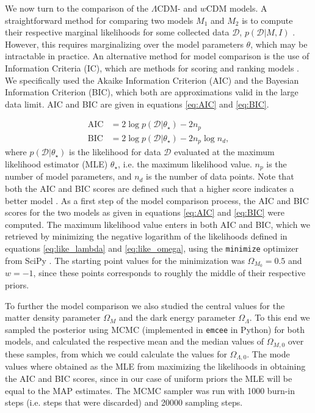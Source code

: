 \documentclass[11pt,a4paper]{article}
\begin{document}
We now turn to the comparison of the $\Lambda$CDM- and $w$CDM models. A straightforward method for comparing two models $M_1$ and $M_2$ is to compute their respective marginal likelihoods for some collected data $\mathcal{D}$, $p\left(\mathcal{D} \vert M, I \right)$ \cite{lec3}. However, this requires marginalizing over the model parameters $\theta$, which may be intractable in practice. An alternative method for model comparison is the use of Information Criteria (IC), which are methods for scoring and ranking models \cite{lec3}. We specifically used the Akaike Information Criterion (AIC) and the Bayesian Information Criterion (BIC), which both are approximations valid in the large data limit. AIC and BIC are given in equations \eqref{eq:AIC} and \eqref{eq:BIC}. 

\begin{align}
    \label{eq:AIC}
    \text{AIC} &= 2 \log{p\left(\mathcal{D} \vert \theta_{\star} \right)} - 2n_p \\
    \label{eq:BIC}
    \text{BIC} &= 2 \log{p\left(\mathcal{D} \vert \theta_{\star} \right)} - 2n_p \log{n_d},
\end{align}
where $p\left(\mathcal{D} \vert \theta_{\star} \right)$ is the likelihood for data $\mathcal{D}$ evaluated at the maximum likelihood estimator (MLE) $\theta_\star$, i.e. the maximum likelihood value. $n_p$ is the number of model parameters, and $n_d$ is the number of data points. Note that both the AIC and BIC scores are defined such that a higher score indicates a better model \cite{lec3}. As a first step of the model comparison process, the AIC and BIC scores for the two models as given in equations \eqref{eq:AIC} and \eqref{eq:BIC} were computed. The maximum likelihood value enters in both AIC and BIC, which we retrieved by minimizing the negative logarithm of the likelihoods defined in equations \eqref{eq:like_lambda} and \eqref{eq:like_omega}, using the \texttt{minimize} optimizer from SciPy \cite{scipy_min}. The starting point values for the minimization was $\Omega_{M_0}=0.5$ and $w=-1$, since these points corresponds to roughly the middle of their respective priors. 

To further the model comparison we also studied the central values for the matter density parameter $\Omega_M$ and the dark energy parameter $\Omega_\Lambda$. To this end we sampled the posterior using MCMC (implemented in \texttt{emcee} in Python) for both models, and calculated the respective mean and the median values of $\Omega_{M,0}$ over these samples, from which we could calculate the values for $\Omega_{\Lambda,0}$. The mode values where obtained as the MLE from maximizing the likelihoods in obtaining the AIC and BIC scores, since in our case of uniform priors the MLE will be equal to the MAP estimates. The MCMC sampler was run with 1000 burn-in steps (i.e. steps that were discarded) and 20000 sampling steps. 
\end{document}
